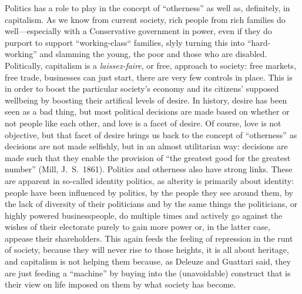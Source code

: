 \documentclass[12pt,a4paper]{article}
\begin{document}
Politics has a role to play in the concept of ``otherness'' as well as,
definitely, in capitalism. As we know from current society, rich
people from rich families do well---especially with a Conservative
government in power, even if they do purport to support
``working-class`` families, slyly turning this into ``hard-working''
and slamming the young, the poor and those who are disabled.
Politically, capitalism is a \textit{laissez-faire}, or free, approach
to society: free markets, free trade, businesses can just start, there
are very few controls in place. This is in order to boost the particular
society's economy and its citizens' supposed wellbeing by boosting
their artifical levels of desire. In history, desire has been seen as
a bad thing, but most political decisions are made based on whether or
not people like each other, and love is a facet of desire. Of course,
love is not objective, but that facet of desire brings us back to the
concept of ``otherness'' as decisions are not made selfishly, but in
an almost utilitarian way: decisions are made such that they enable
the provision of ``the greatest good for the greatest number'' (Mill,
J.\ S.\, 1861). Politics and otherness also have strong links. These
are apparent in so-called identity politics, as alterity is primarily
about identity: people have been influenced by politics, by the people
they see around them, by the lack of diversity of their politicians
and by the same things the politicians, or highly powered
businesspeople, do multiple times and actively go against the wishes
of their electorate purely to gain more power or, in the latter case,
appease their shareholders. This again feeds the feeling of repression
in the runt of society, because they will never rise to those heights,
it is all about heritage, and capitalism is not helping them because,
as Deleuze and Guattari said, they are just feeding a ``machine'' by
buying into the (unavoidable) construct that is their view on life
imposed on them by what society has become.\\
\end{document}
